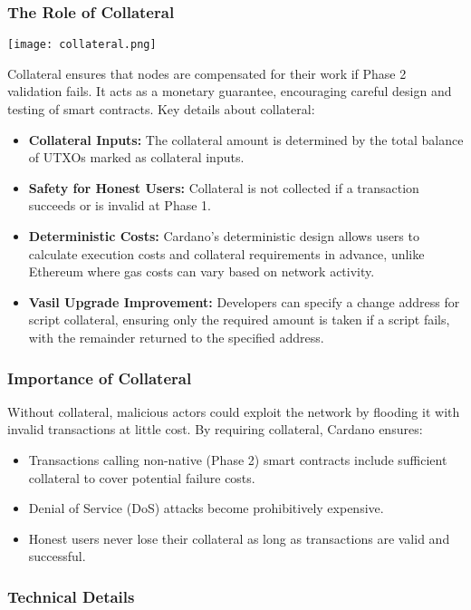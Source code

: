 \subsubsection{The Role of Collateral}
\texttt{[image: collateral.png]}

Collateral ensures that nodes are compensated for their work if Phase 2 validation fails. It acts as a monetary guarantee, encouraging careful design and testing of smart contracts. Key details about collateral:

\begin{itemize}
    \item \textbf{Collateral Inputs:} The collateral amount is determined by the total balance of UTXOs marked as collateral inputs.
    \item \textbf{Safety for Honest Users:} Collateral is not collected if a transaction succeeds or is invalid at Phase 1.
    \item \textbf{Deterministic Costs:} Cardano's deterministic design allows users to calculate execution costs and collateral requirements in advance, unlike Ethereum where gas costs can vary based on network activity.
    \item \textbf{Vasil Upgrade Improvement:} Developers can specify a change address for script collateral, ensuring only the required amount is taken if a script fails, with the remainder returned to the specified address.
\end{itemize}

\subsubsection{Importance of Collateral}

Without collateral, malicious actors could exploit the network by flooding it with invalid transactions at little cost. By requiring collateral, Cardano ensures:

\begin{itemize}
    \item Transactions calling non-native (Phase 2) smart contracts include sufficient collateral to cover potential failure costs.
    \item Denial of Service (DoS) attacks become prohibitively expensive.
    \item Honest users never lose their collateral as long as transactions are valid and successful.
\end{itemize}

\subsubsection{Technical Details}

